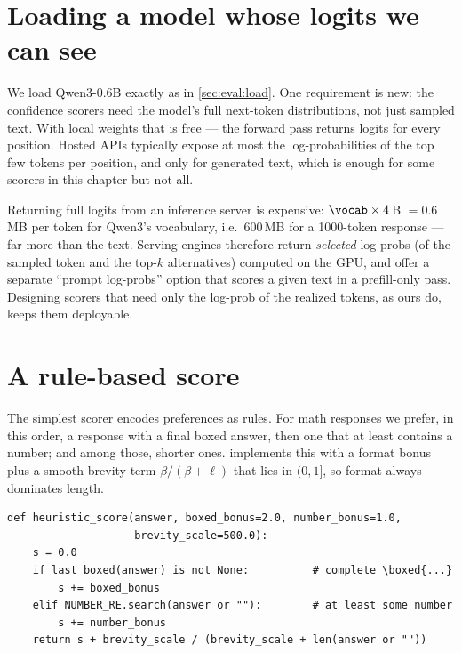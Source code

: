 \section{Loading a model whose logits we can see}\label{sec:refine:load}

We load Qwen3-0.6B exactly as in \cref{sec:eval:load}. One requirement is new: the confidence scorers
need the model's full next-token distributions, not just sampled text. With local weights that is
free --- the forward pass returns logits for every position. Hosted APIs typically expose at most the
log-probabilities of the top few tokens per position, and only for generated text, which is enough
for some scorers in this chapter but not all.

\begin{systemslens}
Returning full logits from an inference server is expensive: $\vocab \times 4$\,B $= 0.6$\,MB per
token for Qwen3's vocabulary, i.e.\ 600\,MB for a 1000-token response --- far more than the text.
Serving engines therefore return \emph{selected} log-probs (of the sampled token and the top-$k$
alternatives) computed on the GPU, and offer a separate ``prompt log-probs'' option that scores a
given text in a prefill-only pass. Designing scorers that need only the log-prob of the realized
tokens, as ours do, keeps them deployable.
\end{systemslens}

\section{A rule-based score}\label{sec:refine:rule}

The simplest scorer encodes preferences as rules. For math responses we prefer, in this order, a
response with a final boxed answer, then one that at least contains a number; and among those, shorter
ones.  implements this with a format bonus plus a smooth brevity term
$\beta/(\beta + \ell)$ that lies in $(0, 1]$, so format always dominates length.

\begin{lstlisting}[caption={A rule-based scorer for format and brevity (\texttt{llmsys/tts.py}).},label={lst:refine:heuristic}]
def heuristic_score(answer, boxed_bonus=2.0, number_bonus=1.0,
                    brevity_scale=500.0):
    s = 0.0
    if last_boxed(answer) is not None:          # complete \boxed{...}
        s += boxed_bonus
    elif NUMBER_RE.search(answer or ""):        # at least some number
        s += number_bonus
    return s + brevity_scale / (brevity_scale + len(answer or ""))
\end{lstlisting}

